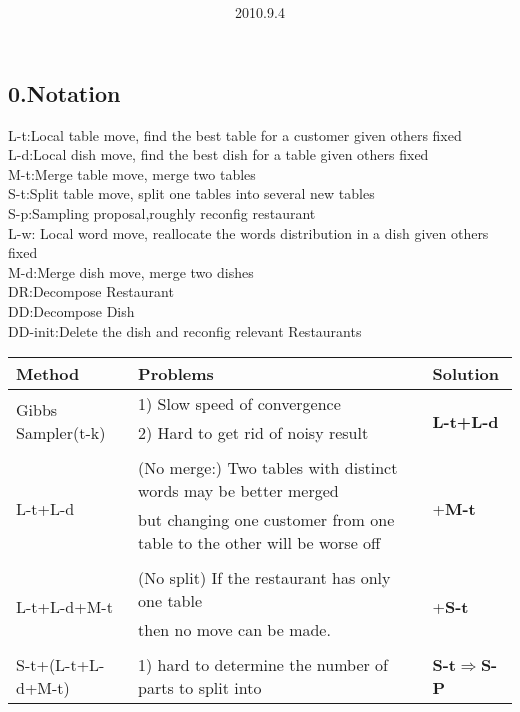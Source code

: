 \documentclass{article}
\title{\vspace{0.3in}\textmd{\textbf{\hmwkTitle}}}
\date{2010.9.4}
\author{\textbf{\hmwkAuthorName}}
\begin{document}
\begin{spacing}{1.1}
\maketitle 
\section{0.Notation}
L-t:Local table move, find the best table for a customer given others fixed\\
L-d:Local dish move, find the best dish for a table given others fixed\\
M-t:Merge table move, merge two tables\\
S-t:Split table move, split one tables into several new tables\\
S-p:Sampling proposal,roughly reconfig restaurant\\
L-w: Local word move, reallocate the words distribution in a dish given others fixed\\
M-d:Merge dish move, merge two dishes\\
DR:Decompose Restaurant\\
DD:Decompose Dish\\
DD-init:Delete the dish and reconfig relevant Restaurants
\begin{table}[t]
\begin{center}
\begin{tabular}{|l|l|l|}
\hline
{\bf Method} &{\bf Problems}&{\bf Solution} \\ 
\hline 
\multirow{3}{*}{Gibbs Sampler(t-k)} & 1) Slow speed of convergence & \multirow{3}{*}{ \bf{L-t}+\bf{L-d}}\\
					              & 2) Hard to get rid of noisy result&\\
&&\\
\hline
\multirow{3}{*}{L-t+L-d}&(No merge:) Two tables with distinct words may be better merged & \multirow{3}{*}{+\bf{M-t}} \\
                            &but changing one customer from one table to the other will be worse off&\\
&&\\
\hline
\multirow{3}{*}{L-t+L-d+M-t} &(No split) If the restaurant has only one table& \multirow{3}{*}{+\bf{S-t}} \\
				 & then no move can be made.&\\
&&\\
\hline
\multirow{3}{*}{S-t+(L-t+L-d+M-t)} &1) hard to determine the number of parts to split into &\multirow{3}{*}{\bf{S-t}$\Rightarrow$\bf{S-P}}\\

\end{tabular}
\end{center}
\end{table}
\end{spacing}
\end{document}
